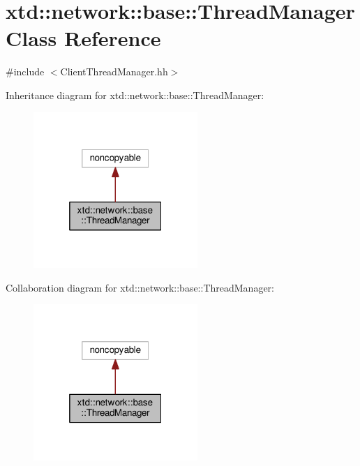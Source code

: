 \hypertarget{classxtd_1_1network_1_1base_1_1ThreadManager}{\section{xtd\-:\-:network\-:\-:base\-:\-:Thread\-Manager Class Reference}
\label{classxtd_1_1network_1_1base_1_1ThreadManager}
}


{\ttfamily \#include $<$Client\-Thread\-Manager.\-hh$>$}



Inheritance diagram for xtd\-:\-:network\-:\-:base\-:\-:Thread\-Manager\-:
\nopagebreak
\begin{figure}[H]
\begin{center}
\leavevmode
\includegraphics[width=176pt]{classxtd_1_1network_1_1base_1_1ThreadManager__inherit__graph}
\end{center}
\end{figure}


Collaboration diagram for xtd\-:\-:network\-:\-:base\-:\-:Thread\-Manager\-:
\nopagebreak
\begin{figure}[H]
\begin{center}
\leavevmode
\includegraphics[width=176pt]{classxtd_1_1network_1_1base_1_1ThreadManager__coll__graph}
\end{center}
\end{figure}
